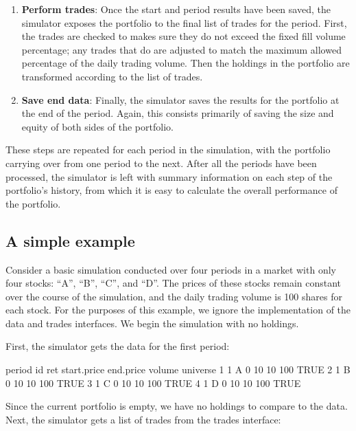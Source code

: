 \documentclass{article}
\begin{document}
\begin{enumerate}
\item{\bf{Perform trades}}: Once the start and period results have
been saved, the simulator exposes the portfolio to the final list of
trades for the period.  First, the trades are checked to makes sure
they do not exceed the fixed fill volume percentage; any trades that
do are adjusted to match the maximum allowed percentage of the daily
trading volume.  Then the holdings in the portfolio are transformed
according to the list of trades.

\item{\bf{Save end data}}: Finally, the simulator saves the results
for the portfolio at the end of the period.  Again, this consists
primarily of saving the size and equity of both sides of the
portfolio.

\end{enumerate}

These steps are repeated for each period in the simulation, with the
portfolio carrying over from one period to the next.  After all the
periods have been processed, the simulator is left with summary
information on each step of the portfolio's history, from which it is
easy to calculate the overall performance of the portfolio.


\subsection{A simple example}

Consider a basic simulation conducted over four periods in a market
with only four stocks: ``A'', ``B'', ``C'', and ``D''.  The prices of
these stocks remain constant over the course of the simulation, and
the daily trading volume is 100 shares for each stock.  For the
purposes of this example, we ignore the implementation of the data and
trades interfaces.  We begin the simulation with no holdings.

First, the simulator gets the data for the first period:

\begin{Schunk}
\begin{Soutput}
  period id ret start.price end.price volume universe
1      1  A   0          10        10    100     TRUE
2      1  B   0          10        10    100     TRUE
3      1  C   0          10        10    100     TRUE
4      1  D   0          10        10    100     TRUE
\end{Soutput}
\end{Schunk}

Since the current portfolio is empty, we have no holdings to compare
to the data.  Next, the simulator gets a list of trades from the
trades interface:
\end{document}
